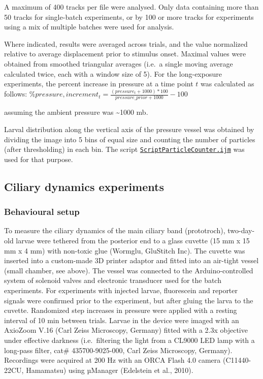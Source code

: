 \documentclass[
  11pt,
]{article}
\begin{document}
A maximum of 400 tracks per file were analysed. Only data containing
more than 50 tracks for single-batch experiments, or by 100 or more
tracks for experiments using a mix of multiple batches were used for
analysis.

Where indicated, results were averaged across trials, and the value
normalized relative to average displacement prior to stimulus onset.
Maximal values were obtained from smoothed triangular averages (i.e.~a
single moving average calculated twice, each with a window size of 5).
For the long-exposure experiments, the percent increase in pressure at a
time point \(t\) was calculated as follows:
\(\%pressure,increment_t = \frac{(pressure_t + 1000)*100}{pressure\_{prior}+1000}-100\)

assuming the ambient pressure was \textasciitilde1000 mb.

Larval distribution along the vertical axis of the pressure vessel was
obtained by dividing the image into 5 bins of equal size and counting
the number of particles (after thresholding) in each bin. The script
\href{https://github.com/JekelyLab/Bezares_et_al_2023_Pressure/blob/main/Code/BatchBehaviour/ScriptParticleCounter.ijm}{\texttt{ScriptParticleCounter.ijm}}
was used for that purpose.

\subsection{Ciliary dynamics
experiments}\label{ciliary-dynamics-experiments}

\subsubsection{Behavioural setup}\label{behavioural-setup}

To measure the ciliary dynamics of the main ciliary band (prototroch),
two-day-old larvae were tethered from the posterior end to a glass
cuvette (15 mm x 15 mm x 4 mm) with non-toxic glue (Wormglu, GluStitch
Inc). The cuvette was inserted into a custom-made 3D printer adaptor and
fitted into an air-tight vessel (small chamber, see above). The vessel
was connected to the Arduino-controlled system of solenoid valves and
electronic transducer used for the batch experiments. For experiments
with injected larvae, fluorescein and reporter signals were confirmed
prior to the experiment, but after gluing the larva to the cuvette.
Randomized step increases in pressure were applied with a resting
interval of 10 min between trials. Larvae in the device were imaged with
an AxioZoom V.16 (Carl Zeiss Microscopy, Germany) fitted with a 2.3x
objective under effective darkness (i.e.~filtering the light from a
CL9000 LED lamp with a long-pass filter, cat\# 435700-9025-000, Carl
Zeiss Microscopy, Germany). Recordings were acquired at 200 Hz with an
ORCA Flash 4.0 camera (C11440-22CU, Hamamatsu) using µManager (Edelstein
et al., 2010).
\end{document}

